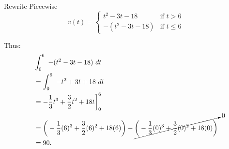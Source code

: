 \documentclass{report}
\begin{document}
    Rewrite Piecewise
       \begin{equation}
        v(t)=
            \begin{cases}
                t^{2}-3t-18& \text{if } t > 6 \\
                 -(t^{2}-3t-18)& \text{if } t \leq 6 
            \end{cases}
        \end{equation}

        \pagebreak \bigbreak \noindent 
        Thus:
        \begin{align*}
            &\int_{0}^{6}\ -(t^{2}-3t-18)\ dt \\
            &=\int_{0}^{6}\ -t^{2}+3t+18\ dt \\
            &= -\frac{1}{3}t^{3}+\frac{3}{2}t^{2}+18t\bigg]^{6}_0 \\
            &= \bigg(-\frac{1}{3}(6)^{3}+\frac{3}{2}(6)^{2}+18(6)\bigg) - \cancelto{0}{\bigg(-\frac{1}{3}(0)^{3}+\frac{3}{2}(0)^{2}+18(0)\bigg)} \\
            &= 90
        .\end{align*}


    



    
    

    
    
\end{document}
